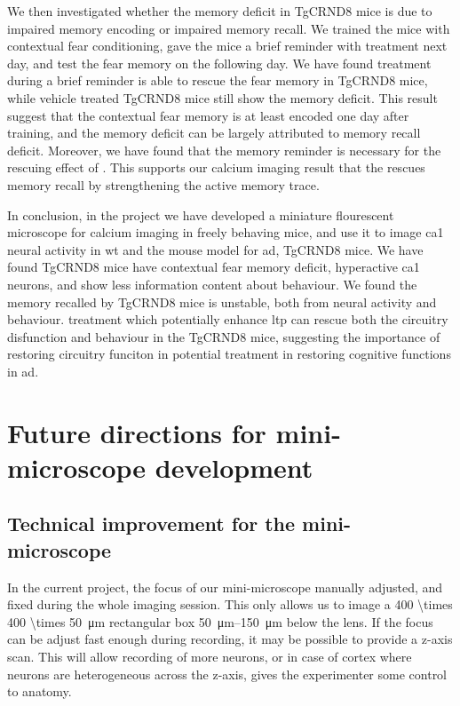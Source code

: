 We then investigated whether the memory deficit in TgCRND8 mice is due to impaired memory encoding or impaired memory recall. We trained the mice with contextual fear conditioning, gave the mice a brief reminder with \tglu treatment next day, and test the fear memory on the following day. We have found \tglu treatment during a brief reminder is able to rescue the fear memory in TgCRND8 mice, while vehicle treated TgCRND8 mice still show the memory deficit. This result suggest that the contextual fear memory is at least encoded one day after training, and the memory deficit can be largely attributed to memory recall deficit. Moreover, we have found that the memory reminder is necessary for the rescuing effect of \tglu. This supports our calcium imaging result that the \tglu rescues memory recall by strengthening the active memory trace. 

In conclusion, in the project we have developed a miniature flourescent microscope for calcium imaging in freely behaving mice, and use it to image \gls{ca1} neural activity in \gls{wt} and the mouse model for \gls{ad}, TgCRND8 mice. We have found TgCRND8 mice have contextual fear memory deficit, hyperactive \gls{ca1} neurons, and show less information content about behaviour. We found the memory recalled by TgCRND8 mice is unstable, both from neural activity and behaviour. \tglu treatment which potentially enhance \gls{ltp} can rescue both the circuitry disfunction and behaviour in the TgCRND8 mice, suggesting the importance of restoring circuitry funciton in potential treatment in restoring cognitive functions in \gls{ad}.

\section{Future directions for mini-microscope development}
\subsection{Technical improvement for the mini-microscope}

In the current project, the focus of our mini-microscope manually adjusted, and fixed during the whole imaging session. This only allows us to image a \SI{400 \times 400 \times 50}{\um} rectangular box \SIrange{50}{150}{\um} below the lens. If the focus can be adjust fast enough during recording, it may be possible to provide a z-axis scan. This will allow recording of more neurons, or in case of cortex where neurons are heterogeneous across the z-axis, gives the experimenter some control to anatomy. 

